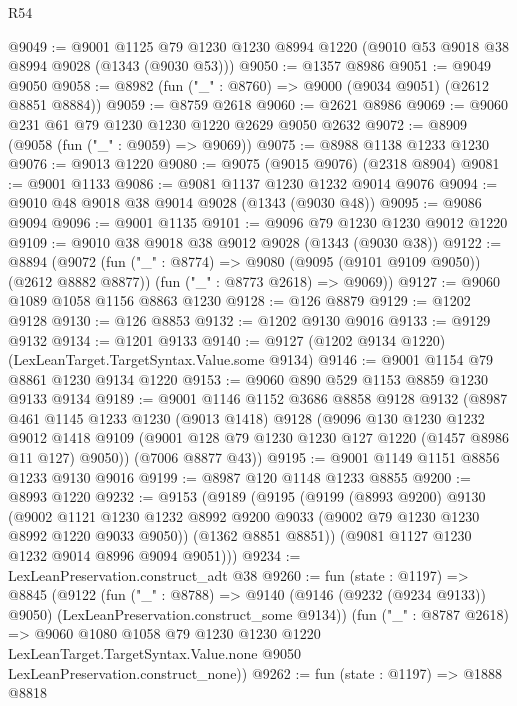 \begin{lexlean}{R54}
\begin{coremodule}
@9049 := @9001
    @1125
    @79
    @1230
    @1230
    @8994
    @1220
    (@9010 @53 @9018 @38 @8994 @9028 (@1343 (@9030 @53)))
@9050 := @1357 @8986
@9051 := @9049 @9050
@9058 := @8982 (fun ("_" : @8760) => @9000 (@9034 @9051) (@2612 @8851 @8884))
@9059 := @8759 @2618
@9060 := @2621 @8986
@9069 := @9060 @231 @61 @79 @1230 @1230 @1220 @2629 @9050 @2632
@9072 := @8909 (@9058 (fun ("_" : @9059) => @9069))
@9075 := @8988 @1138 @1233 @1230
@9076 := @9013 @1220
@9080 := @9075 (@9015 @9076) (@2318 @8904)
@9081 := @9001 @1133
@9086 := @9081 @1137 @1230 @1232 @9014 @9076
@9094 := @9010 @48 @9018 @38 @9014 @9028 (@1343 (@9030 @48))
@9095 := @9086 @9094
@9096 := @9001 @1135
@9101 := @9096 @79 @1230 @1230 @9012 @1220
@9109 := @9010 @38 @9018 @38 @9012 @9028 (@1343 (@9030 @38))
@9122 := @8894
    (@9072
      (fun ("_" : @8774) => @9080 (@9095 (@9101 @9109 @9050)) (@2612 @8882 @8877))
      (fun ("_" : @8773 @2618) => @9069))
@9127 := @9060 @1089 @1058 @1156 @8863 @1230
@9128 := @126 @8879
@9129 := @1202 @9128
@9130 := @126 @8853
@9132 := @1202 @9130 @9016
@9133 := @9129 @9132
@9134 := @1201 @9133
@9140 := @9127 (@1202 @9134 @1220) (LexLeanTarget.TargetSyntax.Value.some @9134)
@9146 := @9001 @1154 @79 @8861 @1230 @9134 @1220
@9153 := @9060 @890 @529 @1153 @8859 @1230 @9133 @9134
@9189 := @9001
    @1146
    @1152
    @3686
    @8858
    @9128
    @9132
    (@8987
      @461
      @1145
      @1233
      @1230
      (@9013 @1418)
      @9128
      (@9096
        @130
        @1230
        @1232
        @9012
        @1418
        @9109
        (@9001 @128 @79 @1230 @1230 @127 @1220 (@1457 @8986 @11 @127) @9050))
      (@7006 @8877 @43))
@9195 := @9001 @1149 @1151 @8856 @1233 @9130 @9016
@9199 := @8987 @120 @1148 @1233 @8855
@9200 := @8993 @1220
@9232 := @9153
    (@9189
      (@9195
        (@9199
          (@8993 @9200)
          @9130
          (@9002
            @1121
            @1230
            @1232
            @8992
            @9200
            @9033
            (@9002 @79 @1230 @1230 @8992 @1220 @9033 @9050))
          (@1362 @8851 @8851))
        (@9081 @1127 @1230 @1232 @9014 @8996 @9094 @9051)))
@9234 := LexLeanPreservation.construct_adt @38
@9260 := fun (state : @1197) =>
  @8845
    (@9122
      (fun ("_" : @8788) =>
      @9140 (@9146 (@9232 (@9234 @9133)) @9050) (LexLeanPreservation.construct_some @9134))
      (fun ("_" : @8787 @2618) =>
      @9060
        @1080
        @1058
        @79
        @1230
        @1230
        @1220
        LexLeanTarget.TargetSyntax.Value.none
        @9050
        LexLeanPreservation.construct_none))
@9262 := fun (state : @1197) => @1888 @8818

\end{coremodule}
\end{lexlean}
